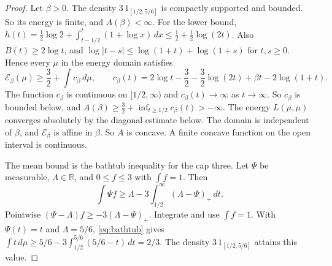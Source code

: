 \begin{proof}
Let \(\beta>0\). The density \(3\,1_{[1/2,5/6]}\) is compactly supported and bounded. So its energy is finite, and \(A(\beta)<\infty\). For the lower bound, \(h(t)=\frac12\log2+\int_{t-1/2}^t(1+\log x)\,dx\le\frac12+\frac12\log(2t)\). Also \(B(t)\ge2\log t\), and \(\log|t-s|\le\log(1+t)+\log(1+s)\) for \(t,s\ge0\). Hence every \(\mu\) in the energy domain satisfies
\[
 \mathcal E_\beta(\mu)\ge\frac32+\int c_\beta\,d\mu,\qquad
 c_\beta(t)=2\log t-\frac32-\frac32\log(2t)+\beta t-2\log(1+t).
\]
The function \(c_\beta\) is continuous on \([1/2,\infty)\) and \(c_\beta(t)\to\infty\) as \(t\to\infty\). So \(c_\beta\) is bounded below, and \(A(\beta)\ge\frac32+\inf_{t\ge1/2}c_\beta(t)>-\infty\). The energy \(L(\mu,\mu)\) converges absolutely by the diagonal estimate below. The domain is independent of \(\beta\), and \(\mathcal E_\beta\) is affine in \(\beta\). So \(A\) is concave. A finite concave function on the open interval is continuous.

The mean bound is the bathtub inequality for the cap three. Let \(\Psi\) be measurable, \(\Lambda\in\mathbb R\), and \(0\le f\le3\) with \(\int f=1\). Then
\begin{equation}\label{eq:bathtub}
 \int\Psi f\ge \Lambda-3\int_{1/2}^\infty(\Lambda-\Psi)_+\,dt.
\end{equation}
Pointwise \((\Psi-\Lambda)f\ge-3(\Lambda-\Psi)_+\). Integrate and use \(\int f=1\). With \(\Psi(t)=t\) and \(\Lambda=5/6\), \eqref{eq:bathtub} gives \(\int t\,d\mu\ge5/6-3\int_{1/2}^{5/6}(5/6-t)\,dt=2/3\). The density \(3\,1_{[1/2,5/6]}\) attains this value.


\end{proof}
